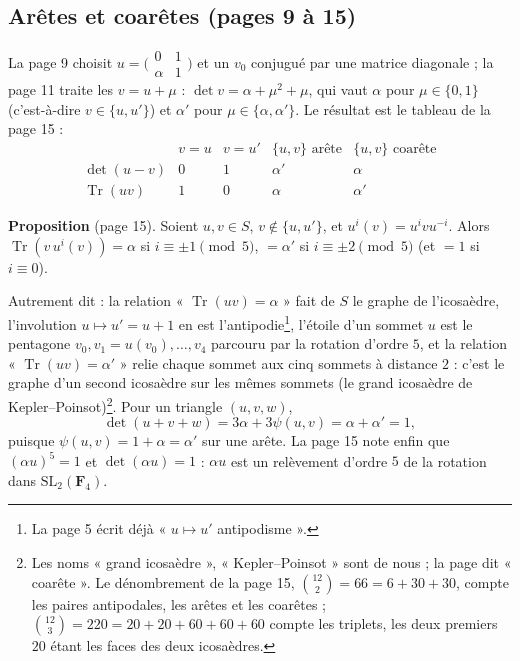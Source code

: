 \documentclass[11pt,a4paper]{article}
\begin{document}
\subsection*{Arêtes et coarêtes (pages 9 à 15)}

La page 9 choisit $u = \bigl(\begin{smallmatrix} 0 & 1 \\ \alpha & 1
\end{smallmatrix}\bigr)$ et un $v_0$ conjugué par une matrice diagonale ; la
page 11 traite les $v = u + \mu$ : $\det v = \alpha + \mu^2 + \mu$, qui vaut
$\alpha$ pour $\mu \in \{0, 1\}$ (c'est-à-dire $v \in \{u, u'\}$) et $\alpha'$
pour $\mu \in \{\alpha, \alpha'\}$. Le résultat est le tableau de la page 15 :
\[
  \begin{array}{c|cccc}
    & v = u & v = u' & \{u, v\} \text{ arête} & \{u, v\} \text{ coarête} \\ \hline
    \det(u - v) & 0 & 1 & \alpha' & \alpha \\
    \operatorname{Tr}(uv) & 1 & 0 & \alpha & \alpha'
  \end{array}
\]

\textbf{Proposition} (page 15). Soient $u, v \in S$, $v \notin \{u, u'\}$, et
$u^i(v) = u^i v u^{-i}$. Alors $\operatorname{Tr}(v\,u^i(v)) = \alpha$ si $i
\equiv \pm 1 \pmod 5$, $= \alpha'$ si $i \equiv \pm 2 \pmod 5$ (et $= 1$ si $i
\equiv 0$).

Autrement dit : la relation « $\operatorname{Tr}(uv) = \alpha$ » fait de $S$ le
graphe de l'icosaèdre, l'involution $u \mapsto u' = u + 1$ en est
l'antipodie\footnote{La page 5 écrit déjà « $u \mapsto u'$ antipodisme ».},
l'étoile d'un sommet $u$ est le pentagone $v_0, v_1 = u(v_0), \ldots, v_4$
parcouru par la rotation d'ordre $5$, et la relation
« $\operatorname{Tr}(uv) = \alpha'$ » relie chaque sommet aux cinq sommets à
distance $2$ : c'est le graphe d'un second icosaèdre sur les mêmes sommets
(le grand icosaèdre de Kepler--Poinsot)\footnote{Les noms « grand
icosaèdre », « Kepler--Poinsot » sont de nous ; la page dit
« coarête ». Le dénombrement de la page 15, $\binom{12}{2} = 66 = 6 + 30 +
30$, compte les paires antipodales, les arêtes et les coarêtes ; $\binom{12}{3}
= 220 = 20 + 20 + 60 + 60 + 60$ compte les triplets, les deux premiers $20$
étant les faces des deux icosaèdres.}. Pour un triangle $(u, v, w)$,
\[
  \det(u + v + w) = 3\alpha + 3\psi(u, v) = \alpha + \alpha' = 1,
\]
puisque $\psi(u, v) = 1 + \alpha = \alpha'$ sur une arête. La page 15 note enfin
que $(\alpha u)^5 = 1$ et $\det(\alpha u) = 1$ : $\alpha u$ est un relèvement
d'ordre $5$ de la rotation dans $\mathrm{SL}_2(\mathbf{F}_4)$.
\end{document}
